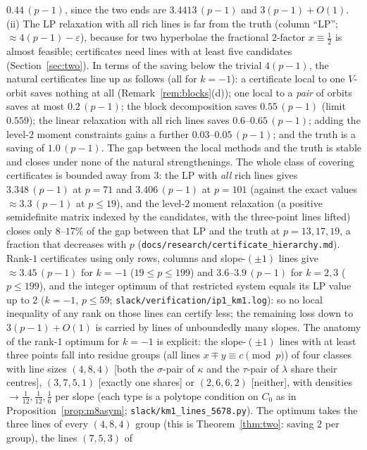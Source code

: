 \documentclass[11pt]{article}
\theoremstyle{remark}
\begin{document}
$0.44\,(p-1)$, since the two ends are $3.4413\,(p-1)$ and $3(p-1)+O(1)$.  (ii) The LP relaxation with all rich lines is far
from the truth (column ``LP''; $\approx4(p-1)-\varepsilon$), because for two hyperbolae the fractional $2$-factor $x\equiv\tfrac12$ is
almost feasible; certificates need lines with at least five candidates (Section~\ref{sec:two}).  In terms of the saving below the trivial $4(p-1)$, the natural certificates line up as follows (all for $k=-1$):
a certificate local to one $V$-orbit saves nothing at all (Remark~\ref{rem:blocks}(d)); one local to a \emph{pair} of orbits saves at most
$0.2\,(p-1)$; the block decomposition saves $0.55\,(p-1)$ (limit $0.559$); the linear relaxation with all rich lines saves
$0.6$--$0.65\,(p-1)$; adding the level-$2$ moment constraints gains a further $0.03$--$0.05\,(p-1)$; and the truth is a saving of
$1.0\,(p-1)$.  The gap between the local methods and the truth is stable and closes under none of the natural strengthenings.
The whole class of covering certificates is bounded away from $3$: the LP with \emph{all}
rich lines gives $3.348\,(p-1)$ at $p=71$ and $3.406\,(p-1)$ at $p=101$ (against the exact values $\approx3.3\,(p-1)$ at $p\le19$), and the
level-$2$ moment relaxation (a positive semidefinite matrix indexed by the candidates, with the three-point lines lifted) closes only
$8$--$17\%$ of the gap between that LP and the truth at $p=13,17,19$, a fraction that decreases with $p$
(\texttt{docs/research/certificate\_hierarchy.md}).  Rank-$1$ certificates using only
rows, columns and slope-$(\pm1)$ lines give $\approx3.45\,(p-1)$ for $k=-1$ ($19\le p\le199$) and $3.6$--$3.9\,(p-1)$ for $k=2,3$
($p\le199$), and the integer optimum of that restricted system equals its LP value up to $2$ ($k=-1$, $p\le59$; \texttt{slack/verification/ip1\_km1.log}): so no local
inequality of any rank on those lines can certify less; the remaining loss down to $3(p-1)+O(1)$ is carried by lines of unboundedly
many slopes.  The anatomy of the rank-$1$ optimum for $k=-1$ is explicit: the slope-$(\pm1)$ lines with at least three points fall into
residue groups (all lines $x\mp y\equiv c\pmod p$) of four classes with line sizes $(4,8,4)$ [both the $\sigma$-pair of $\kappa$ and the
$\tau$-pair of $\lambda$ share their centres], $(3,7,5,1)$ [exactly one shares] or $(2,6,6,2)$ [neither], with densities $\to\tfrac1{12},
\tfrac1{12},\tfrac16$ per slope (each type is a polytope condition on $C_0$ as in Proposition~\ref{prop:m8asym}; \texttt{slack/km1\_lines\_5678.py}).
The optimum takes the three lines of every $(4,8,4)$ group (this is Theorem~\ref{thm:two}: saving $2$ per group), the lines $(7,5,3)$ of
\end{document}
